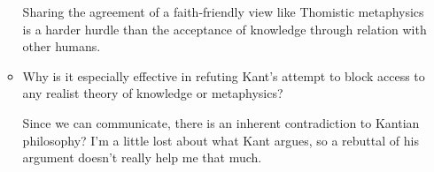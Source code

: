 \documentclass[12pt]{article}[titlepage]
\newcommand{\1}{\={a}}
\newcommand{\2}{\={e}}
\newcommand{\3}{\={\i}}
\newcommand{\4}{\=o}
\newcommand{\5}{\=u}
\newcommand{\6}{\={A}}
\renewcommand{\,}{\textsuperscript{,}}
\begin{document}
\begin{enumerate}
\begin{itemize}
Sharing the agreement of a faith-friendly view like Thomistic metaphysics is a harder hurdle than the acceptance of knowledge through relation with other humans.
\item Why is it especially effective in refuting Kant's attempt to block access to any realist theory of knowledge or metaphysics?

Since we can communicate, there is an inherent contradiction to Kantian philosophy?
I'm a little lost about what Kant argues, so a rebuttal of his argument doesn't really help me that much.

\end{itemize}
\end{enumerate}
\end{document}
